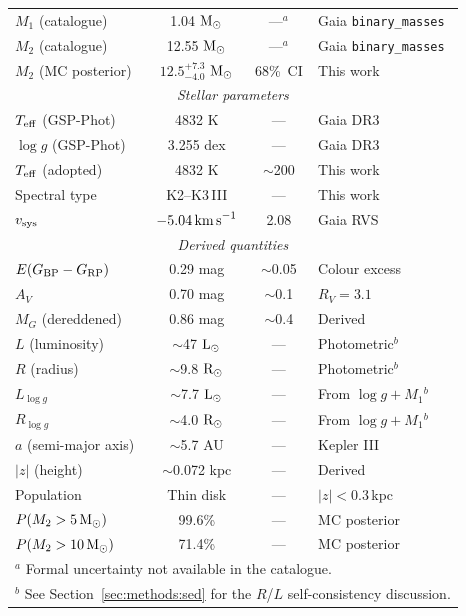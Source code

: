 \documentclass[usenatbib,fleqn]{mnras}
\newcommand{\Msun}{{\rm M}_\odot}
\newcommand{\Lsun}{{\rm L}_\odot}
\newcommand{\Rsun}{{\rm R}_\odot}
\newcommand{\kms}{{\rm km\,s}^{-1}}
\begin{document}
\begin{table}
\begin{tabular}{lccl}
$M_1$ (catalogue)      & 1.04 $\Msun$         & ---$^a$  & Gaia \texttt{binary\_masses} \\
$M_2$ (catalogue)      & 12.55 $\Msun$        & ---$^a$  & Gaia \texttt{binary\_masses} \\
$M_2$ (MC posterior)   & $12.5^{+7.3}_{-4.0}$ $\Msun$ & 68\%~CI & This work \\
\midrule
\multicolumn{4}{c}{\textit{Stellar parameters}} \\
$T_{\rm eff}$ (GSP-Phot)   & 4832 K           & ---      & Gaia DR3 \\
$\log g$ (GSP-Phot)        & 3.255 dex        & ---      & Gaia DR3 \\
$T_{\rm eff}$ (adopted)    & 4832 K           & $\sim$200 & This work \\
Spectral type              & K2--K3\,III      & ---      & This work \\
$v_{\rm sys}$              & $-5.04\,\kms$    & 2.08     & Gaia RVS \\
\midrule
\multicolumn{4}{c}{\textit{Derived quantities}} \\
$E(G_{\rm BP} - G_{\rm RP})$ & 0.29 mag       & $\sim$0.05 & Colour excess \\
$A_V$                  & 0.70 mag             & $\sim$0.1 & $R_V = 3.1$ \\
$M_G$ (dereddened)     & 0.86 mag             & $\sim$0.4 & Derived \\
$L$ (luminosity)       & $\sim$47 $\Lsun$     & ---      & Photometric$^b$ \\
$R$ (radius)           & $\sim$9.8 $\Rsun$    & ---      & Photometric$^b$ \\
$L_{\log g}$           & $\sim$7.7 $\Lsun$    & ---      & From $\log g + M_1$$^b$ \\
$R_{\log g}$           & $\sim$4.0 $\Rsun$    & ---      & From $\log g + M_1$$^b$ \\
$a$ (semi-major axis)  & $\sim$5.7 AU         & ---      & Kepler III \\
$|z|$ (height)         & $\sim$0.072 kpc      & ---      & Derived \\
Population             & Thin disk            & ---      & $|z| < 0.3$\,kpc \\
$P(M_2 > 5\,\Msun)$   & 99.6\%               & ---      & MC posterior \\
$P(M_2 > 10\,\Msun)$  & 71.4\%               & ---      & MC posterior \\
\bottomrule
\multicolumn{4}{l}{$^a$ Formal uncertainty not available in the catalogue.}\\
\multicolumn{4}{l}{$^b$ See Section~\ref{sec:methods:sed} for the $R$/$L$ self-consistency discussion.}\\
\end{tabular}
\end{table}
\end{document}
